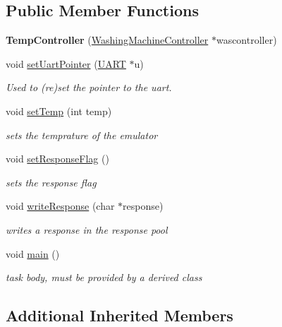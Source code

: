 \subsection*{Public Member Functions}
\begin{DoxyCompactItemize}
\item 
{\bfseries Temp\+Controller} (\hyperlink{class_washing_machine_controller}{Washing\+Machine\+Controller} $\ast$wascontroller)\hypertarget{class_temp_controller_a72e4402b3b4278f8f043792d3aef6a6c}{}\label{class_temp_controller_a72e4402b3b4278f8f043792d3aef6a6c}

\item 
void \hyperlink{class_temp_controller_a28853451754e16f43a08b086f47c2d0c}{set\+Uart\+Pointer} (\hyperlink{class_u_a_r_t}{U\+A\+RT} $\ast$u)
\begin{DoxyCompactList}\small\item\em Used to (re)set the pointer to the uart. \end{DoxyCompactList}\item 
void \hyperlink{class_temp_controller_a6ed0fe5c5e16eaeb1cf4823e629204c5}{set\+Temp} (int temp)
\begin{DoxyCompactList}\small\item\em sets the temprature of the emulator \end{DoxyCompactList}\item 
void \hyperlink{class_temp_controller_a8652d8509bf7e01e527a9a26bfc5419c}{set\+Response\+Flag} ()
\begin{DoxyCompactList}\small\item\em sets the response flag \end{DoxyCompactList}\item 
void \hyperlink{class_temp_controller_a0805825500af4fd932739157174589fe}{write\+Response} (char $\ast$response)
\begin{DoxyCompactList}\small\item\em writes a response in the response pool \end{DoxyCompactList}\item 
void \hyperlink{class_temp_controller_a2e2a50ee8bc46aade551f39839a43baf}{main} ()
\begin{DoxyCompactList}\small\item\em task body, must be provided by a derived class \end{DoxyCompactList}\end{DoxyCompactItemize}
\subsection*{Additional Inherited Members}


